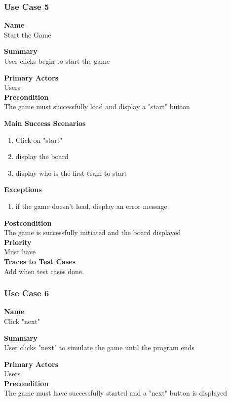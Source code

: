 \documentclass[12pt]{article}
\begin{document}
\subsubsection{Use Case 5} \label{uc:5}
\noindent
{\bf Name}\\
Start the Game

\noindent
{\bf Summary}\\
User clicks begin to start the game

\noindent
{\bf Primary Actors}\\
Users\\
\noindent
{\bf Precondition}\\
The game must successfully load and display a "start" button

\noindent
{\bf Main Success Scenarios}\\
\vspace*{-0.2in}
\begin{enumerate}
\item Click on "start"
\item display the board
\item display who is the first team to start
\end{enumerate}
\noindent
{\bf Exceptions}
\begin{enumerate}
\item if the game doesn't load, display an error message
\end{enumerate}
\noindent
{\bf Postcondition}\\
The game is successfully initiated and the board displayed\\
\noindent
{\bf Priority}\\
Must have\\
\noindent
{\bf Traces to Test Cases}\\
Add when test cases done.
\newpage

\subsubsection{Use Case 6} \label{uc:6}
\noindent
{\bf Name}\\
Click "next"

\noindent
{\bf Summary}\\
User clicks "next" to simulate the game until the program ends

\noindent
{\bf Primary Actors}\\
Users\\
\noindent
{\bf Precondition}\\
The game must have successfully started and a "next" button is displayed
\end{document}
